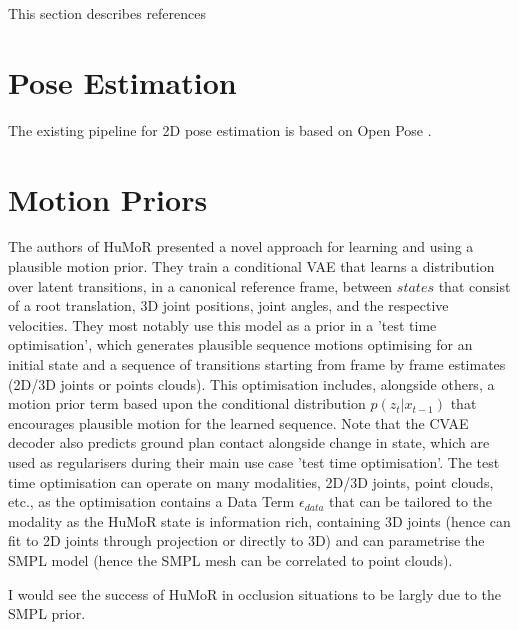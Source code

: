 
This section describes references

\section{Pose Estimation}
The existing pipeline for 2D pose estimation is based on Open Pose \cite{openPose}.


\section{Motion Priors}

The authors of HuMoR \cite{humor} presented a novel approach for learning and using a plausible motion prior. They train a conditional VAE that learns a distribution over latent transitions, in a canonical reference frame, between $\textit{states}$ that consist of a root translation, 3D joint positions, joint angles, and the respective velocities. They most notably use this model as a prior in a 'test time optimisation', which generates plausible sequence motions optimising for an initial state and a sequence of transitions starting from frame by frame estimates (2D/3D joints or points clouds). This optimisation includes, alongside others, a motion prior term based upon the conditional distribution $p(z_t|x_{t-1})$ that encourages plausible motion for the learned sequence. Note that the CVAE decoder also predicts ground plan contact alongside change in state, which are used as regularisers during their main use case 'test time optimisation'. The test time optimisation can operate on many modalities, 2D/3D joints, point clouds, etc., as the optimisation contains a Data Term $\epsilon_{data}$ that can be tailored to the modality as the HuMoR state is information rich, containing 3D joints (hence can fit to 2D joints through projection or directly to 3D) and can parametrise the SMPL model (hence the SMPL mesh can be correlated to point clouds).

I would see the success of HuMoR in occlusion situations to be largly due to the SMPL prior.


